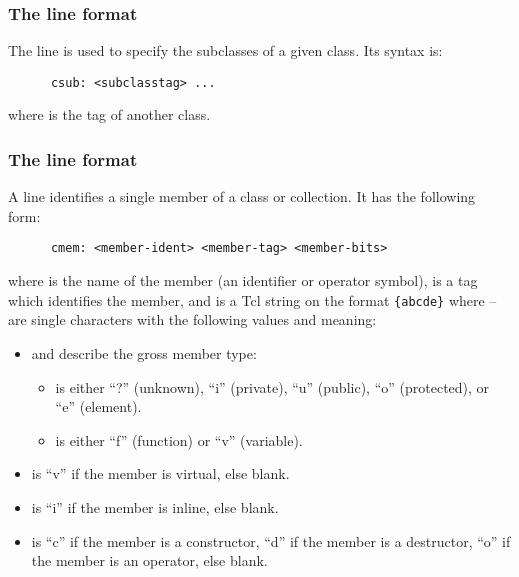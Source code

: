 \subsubsection{The  line format}

The  line is used to specify the subclasses of a given class.
Its syntax is:

\begin{verbatim}
      csub: <subclasstag> ...
\end{verbatim}

\noindent 
where  is the tag of another class.

\subsubsection{The  line format}

A  line identifies a single member of a class or collection.
It has the following form:

\begin{verbatim}
      cmem: <member-ident> <member-tag> <member-bits>
\end{verbatim}

\noindent 
where  is the name of the member (an identifier or
operator symbol),  is a tag which identifies the
member, and  is a Tcl string on the format
\verb+{abcde}+ where -- are single characters with the
following values and meaning:

\begin{itemize}
 \item {} and  describe the gross member type:
  \begin{itemize}
   \item {} is either ``?'' (unknown), ``i'' (private), ``u'' (public),
         ``o'' (protected), or ``e'' (element).
   \item {} is either ``f'' (function) or ``v'' (variable).
  \end{itemize}
 \item {} is ``v'' if the member is virtual, else blank.
 \item {} is ``i'' if the member is inline, else blank.
 \item {} is ``c'' if the member is a constructor, ``d'' if the member
       is a destructor, ``o'' if the member is an operator, else blank.
\end{itemize}

